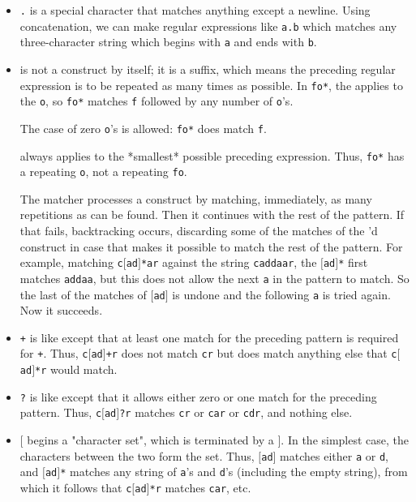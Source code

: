 \begin{itemize}
\itemsep=0pt

\item \rtfsp
{\tt .} is a special character that matches anything except a newline. 
Using concatenation, we can make regular expressions like {\tt a.b}
which matches any three-character string which begins with {\tt a}
and ends with {\tt b}.

\item \rtfsp
{\tt *} is not a construct by itself; it is a suffix, which means the
preceding regular expression is to be repeated as many times as
possible. In {\tt fo*}, the {\tt *} applies to the {\tt o}, so {\tt fo*}
matches {\tt f} followed by any number of {\tt o}'s.

The case of zero {\tt o}'s is allowed: {\tt fo*} does match {\tt f}.

{\tt *} always applies to the *smallest* possible preceding
expression. Thus, {\tt fo*} has a repeating {\tt o}, not a repeating
{\tt fo}.

The matcher processes a {\tt *} construct by matching, immediately,
as many repetitions as can be found. Then it continues with the
rest of the pattern. If that fails, backtracking occurs,
discarding some of the matches of the {\tt *}'d construct in case
that makes it possible to match the rest of the pattern. For
example, matching {\tt c$[$ad$]$*ar} against the string {\tt caddaar}, the
{\tt $[$ad$]$*} first matches {\tt addaa}, but this does not allow the next
{\tt a} in the pattern to match. So the last of the matches of
{\tt $[$ad$]$} is undone and the following {\tt a} is tried again. Now it
succeeds.

\item \rtfsp
{\tt +} is like {\tt *} except that at least one match for the preceding
pattern is required for {\tt +}. Thus, {\tt c$[$ad$]$+r} does not match
{\tt cr} but does match anything else that {\tt c$[$ad$]$*r} would match.

\item \rtfsp
{\tt ?} is like {\tt *} except that it allows either zero or one match
for the preceding pattern. Thus, {\tt c$[$ad$]$?r} matches {\tt cr} or
{\tt car} or {\tt cdr}, and nothing else.

\item \rtfsp
{\tt $[$} begins a "character set", which is terminated by a {\tt $]$}. In
the simplest case, the characters between the two form the set. 
Thus, {\tt $[$ad$]$} matches either {\tt a} or {\tt d}, and {\tt $[$ad$]$*} matches any
string of {\tt a}'s and {\tt d}'s (including the empty string), from
which it follows that {\tt c$[$ad$]$*r} matches {\tt car}, etc.


\end{itemize}
